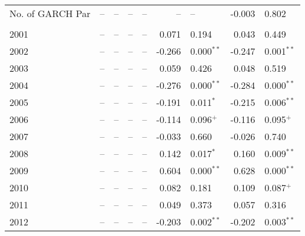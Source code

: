 \documentclass[12pt]{article}
\begin{document}
\begin{table}[!ht]
\begin{tabular}{l r l r l r l r l}
        No. of GARCH Par             &      -- & --           &      -- & --            &          -- & --             &  -0.003 & 0.802          \\
                                                                                                                                                  \\      
        2001                         &      -- & --           &      -- & --            &       0.071 & 0.194          &   0.043 & 0.449          \\
        2002                         &      -- & --           &      -- & --            &      -0.266 & 0.000$^{**}$   &  -0.247 & 0.001$^{**}$   \\
        2003                         &      -- & --           &      -- & --            &       0.059 & 0.426          &   0.048 & 0.519          \\
        2004                         &      -- & --           &      -- & --            &      -0.276 & 0.000$^{**}$   &  -0.284 & 0.000$^{**}$   \\
        2005                         &      -- & --           &      -- & --            &      -0.191 & 0.011$^{*}$    &  -0.215 & 0.006$^{**}$   \\
        2006                         &      -- & --           &      -- & --            &      -0.114 & 0.096$^{+}$    &  -0.116 & 0.095$^{+}$    \\
        2007                         &      -- & --           &      -- & --            &      -0.033 & 0.660          &  -0.026 & 0.740          \\
        2008                         &      -- & --           &      -- & --            &       0.142 & 0.017$^{*}$    &   0.160 & 0.009$^{**}$   \\
        2009                         &      -- & --           &      -- & --            &       0.604 & 0.000$^{**}$   &   0.628 & 0.000$^{**}$   \\
        2010                         &      -- & --           &      -- & --            &       0.082 & 0.181          &   0.109 & 0.087$^{+}$    \\
        2011                         &      -- & --           &      -- & --            &       0.049 & 0.373          &   0.057 & 0.316          \\
        2012                         &      -- & --           &      -- & --            &      -0.203 & 0.002$^{**}$   &  -0.202 & 0.003$^{**}$   \\

\end{tabular}
\end{table}
\end{document}
